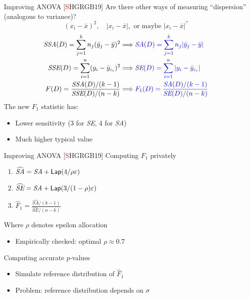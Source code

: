 \documentclass{beamer}
\newcommand{\sse}{\textit{SSE}\xspace}
\newcommand{\ssa}{\textit{SSA}\xspace}
\newcommand{\se}{\textit{SE}\xspace}
\newcommand{\sa}{\textit{SA}\xspace}
\newcommand{\lap}{\ensuremath{{\sf Lap}}\xspace}
\begin{document}
\begin{frame}{Improving ANOVA [\textcolor{red}{S}HGRGB19]}
Are there other ways of measuring ``dispersion'' (analogous to variance)? \pause
$$(x_i - \bar{x})^2, \quad \lvert x_i - \bar{x} \rvert, \text{ or maybe }\lvert x_i - \bar{x} \rvert^?$$  \pause
\begin{align*}
\ssa(D) = \sum_{j=1}^{k} n_j (\bar{y}_j - \bar{y})^2  &\Longrightarrow \textcolor{blue}{ \sa(D) = \sum_{j=1}^{k} n_j |\bar{y}_j - \bar{y}| }\\  
\sse(D) = \sum_{i=1}^{n}  (y_{i}-\bar{y}_{c_i})^2  &\Longrightarrow \textcolor{blue}{\se(D) = \sum_{i=1}^{n}  |y_{i}-\bar{y}_{c_i}| } \\  
F(D) = \frac{\ssa(D)/(k-1)}{\sse(D)/(n-k)} &\Longrightarrow  \textcolor{blue} {F_1(D) = \frac{\sa(D)/(k-1)}{\se(D)/(n-k)}}
\end{align*}
 \pause
The new $F_1$ statistic has: \pause
\begin{itemize}
\item Lower sensitivity (3 for \se, 4 for \sa) \pause
\item Much higher typical value 
\end{itemize}
\end{frame}



\begin{frame}{Improving ANOVA [\textcolor{red}{S}HGRGB19]}
Computing $F_1$ privately \pause
\begin{enumerate}
	\item $\widehat{\sa}  = \sa + \lap(4/\rho\varepsilon)$
    \item $\widehat{\se} = \sa + \lap(3/(1-\rho)\varepsilon)$ \pause
    \item $\widehat{F}_1 = \frac{\widehat{\sa}/(k-1)}{\widehat{\se}/(n-k)}$ \pause
\end{enumerate}
Where $\rho$ denotes epsilon allocation
\begin{itemize}
	\item Empirically checked: optimal $\rho \approx 0.7$ \pause
\end{itemize}
Computing accurate $p$-values \pause
\begin{itemize}
	\item Simulate reference distribution of $\widehat{F}_1$ \pause
	\item Problem: reference distribution depends on $\sigma$
\end{itemize}
\end{frame}
\end{document}
